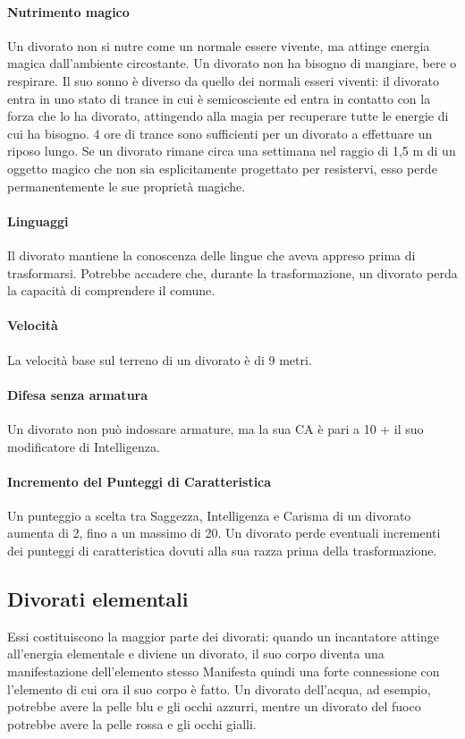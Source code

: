 \paragraph{Nutrimento magico} Un divorato non si nutre come un normale essere vivente, ma attinge energia magica dall'ambiente circostante. Un divorato non ha bisogno di mangiare, bere o respirare. Il suo sonno è diverso da quello dei normali esseri viventi: il divorato entra in uno stato di trance in cui è semicosciente ed entra in contatto con la forza che lo ha divorato, attingendo alla magia per recuperare tutte le energie di cui ha bisogno. 4 ore di trance sono sufficienti per un divorato a effettuare un riposo lungo. Se un divorato rimane circa una settimana nel raggio di 1,5 m di un oggetto magico che non sia esplicitamente progettato per resistervi, esso perde permanentemente le sue proprietà magiche.
\paragraph{Linguaggi} Il divorato mantiene la conoscenza delle lingue che aveva appreso prima di trasformarsi. Potrebbe accadere che, durante la trasformazione, un divorato perda la capacità di comprendere il comune.
\paragraph{Velocità} La velocità base sul terreno di un divorato è di 9 metri.
\paragraph{Difesa senza armatura} Un divorato non può indossare armature, ma la sua CA è pari a 10 + il suo modificatore di Intelligenza.
\paragraph{Incremento del Punteggi di Caratteristica} Un punteggio a scelta tra Saggezza, Intelligenza e Carisma di un divorato aumenta di 2, fino a un massimo di 20. Un divorato perde eventuali incrementi dei punteggi di caratteristica dovuti alla sua razza prima della trasformazione.

\subsection{Divorati elementali}
Essi costituiscono la maggior parte dei divorati: quando un incantatore attinge all'energia elementale e diviene un divorato, il suo corpo diventa una manifestazione dell'elemento stesso Manifesta quindi una forte connessione con l'elemento di cui ora il suo corpo è fatto. Un divorato dell'acqua, ad esempio, potrebbe avere la pelle blu e gli occhi azzurri, mentre un divorato del fuoco potrebbe avere la pelle rossa e gli occhi gialli.

